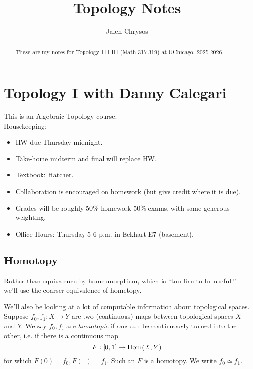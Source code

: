 \documentclass{amsart}
\title{Topology Notes}
\author{Jalen Chrysos}
\begin{document}
	
	\maketitle
	\begin{abstract}
		These are my notes for Topology I-II-III (Math 317-319) at UChicago, 2025-2026.
	\end{abstract}
	
	\tableofcontents
	
	\newpage
	
	\section*{Topology I with Danny Calegari}
	
	This is an Algebraic Topology course.\\
	
	Housekeeping:
	\begin{itemize}
		\item HW due Thursday midnight.
		\item Take-home midterm and final will replace HW.
		\item Textbook: \href{https://pi.math.cornell.edu/~hatcher/AT/AT.pdf}{Hatcher}.
		\item Collaboration is encouraged on homework (but give credit where it is due).
		\item Grades will be roughly 50\% homework 50\% exams, with some generous weighting.
		\item Office Hours: Thursday 5-6 p.m. in Eckhart E7 (basement).
	\end{itemize}
	
	
	\subsection{Homotopy}
	
	Rather than equivalence by homeomorphism, which is ``too fine to be useful,'' we'll use the coarser equivalence of homotopy.
	
	We'll also be looking at a lot of computable information about topological spaces. \\
	
	Suppose $f_0,f_1:X\to Y$ are two (continuous) maps between topological spaces $X$ and $Y$. We say $f_0,f_1$ are \textit{homotopic} if one can be continuously turned into the other, i.e. if there is a continuous map
	$$
	F:[0,1]\to \operatorname{Hom}(X,Y)
	$$
	for which $F(0)=f_0,F(1)=f_1$. Such an $F$ is a homotopy. We write $f_0\simeq f_1$.
	
\end{document}
